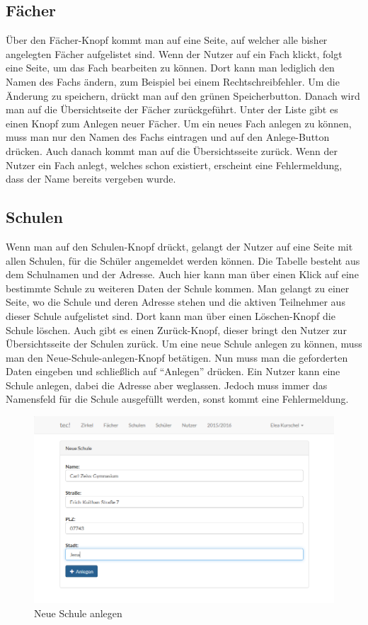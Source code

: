 \subsection{Fächer}
Über den Fächer-Knopf kommt man auf eine Seite, auf welcher alle bisher angelegten Fächer aufgelistet sind. Wenn der Nutzer auf ein Fach klickt, folgt eine Seite, um das Fach bearbeiten zu können. Dort kann man lediglich den Namen des Fachs ändern, zum Beispiel bei einem Rechtschreibfehler. Um die Änderung zu speichern, drückt man auf den grünen Speicherbutton. Danach wird man auf die Übersichtseite der Fächer zurückgeführt. Unter der Liste gibt es einen Knopf zum Anlegen neuer Fächer. Um ein neues Fach anlegen zu können, muss man nur den Namen des Fachs eintragen und auf den Anlege-Button drücken. Auch danach kommt man auf die Übersichtsseite zurück. Wenn der Nutzer ein Fach anlegt, welches schon existiert, erscheint eine Fehlermeldung, dass der Name bereits vergeben wurde.

\subsection{Schulen}
Wenn man auf den Schulen-Knopf drückt, gelangt der Nutzer auf eine Seite mit allen Schulen, für die Schüler angemeldet werden können. Die Tabelle besteht aus dem Schulnamen und der Adresse. Auch hier kann man über einen Klick auf eine bestimmte Schule zu weiteren Daten der Schule kommen. Man gelangt zu einer Seite, wo die Schule und deren Adresse stehen und die aktiven Teilnehmer aus dieser Schule aufgelistet sind. Dort kann man über einen Löschen-Knopf die Schule löschen. Auch gibt es einen Zurück-Knopf, dieser bringt den Nutzer zur Übersichtsseite der Schulen zurück. Um eine neue Schule anlegen zu können, muss man den Neue-Schule-anlegen-Knopf betätigen. Nun muss man die geforderten Daten eingeben und schließlich auf "`Anlegen"' drücken. Ein Nutzer kann eine Schule anlegen, dabei die Adresse aber weglassen. Jedoch muss immer das Namensfeld für die Schule ausgefüllt werden, sonst kommt eine Fehlermeldung.

\begin{figure}[h]
	\centering
	\includegraphics[scale=.45]{bilder/Neue_Schule_anlegen.png}
	\caption{Neue Schule anlegen}
\end{figure}

